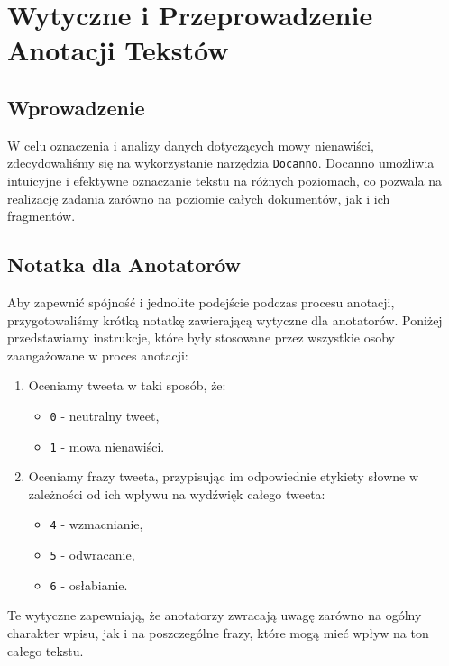 \documentclass[12pt]{article}
\begin{document}
\section{Wytyczne i Przeprowadzenie Anotacji Tekstów}

\subsection{Wprowadzenie}
W celu oznaczenia i analizy danych dotyczących mowy nienawiści, zdecydowaliśmy się na wykorzystanie narzędzia \texttt{Docanno}. Docanno umożliwia intuicyjne i efektywne oznaczanie tekstu na różnych poziomach, co pozwala na realizację zadania zarówno na poziomie całych dokumentów, jak i ich fragmentów.

\subsection{Notatka dla Anotatorów}
Aby zapewnić spójność i jednolite podejście podczas procesu anotacji, przygotowaliśmy krótką notatkę zawierającą wytyczne dla anotatorów. Poniżej przedstawiamy instrukcje, które były stosowane przez wszystkie osoby zaangażowane w proces anotacji:

\begin{enumerate}
    \item Oceniamy tweeta w taki sposób, że:
    \begin{itemize}
        \item \texttt{0} - neutralny tweet,
        \item \texttt{1} - mowa nienawiści.
    \end{itemize}
    
    \item Oceniamy frazy tweeta, przypisując im odpowiednie etykiety słowne w zależności od ich wpływu na wydźwięk całego tweeta:
    \begin{itemize}
        \item \texttt{4} - wzmacnianie,
        \item \texttt{5} - odwracanie,
        \item \texttt{6} - osłabianie.
    \end{itemize}
\end{enumerate}

Te wytyczne zapewniają, że anotatorzy zwracają uwagę zarówno na ogólny charakter wpisu, jak i na poszczególne frazy, które mogą mieć wpływ na ton całego tekstu.
\end{document}
